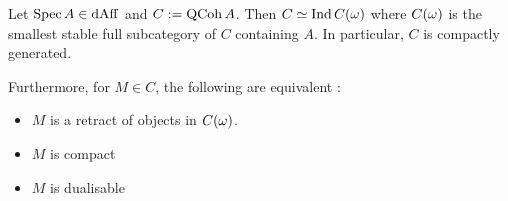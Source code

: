 \documentclass[./main.tex]{subfiles}
\begin{document}
\begin{prop}

  Let $\mathrm{Spec}\,A \in \mathrm{dAff}$ and $C := \mathrm{QCoh}\,A$.
  Then $C \simeq \mathrm{Ind}\,C(\omega)$ where
  $C(\omega)$ is the smallest stable full subcategory of $C$ containing $A$.
  In particular, $C$ is compactly generated.
  
  Furthermore, for $M \in C$, the following are equivalent : 
  \begin{itemize}
    \item $M$ is a retract of objects in $C(\omega)$.
    \item $M$ is compact
    \item $M$ is dualisable
  \end{itemize}

\end{prop}
\end{document}

